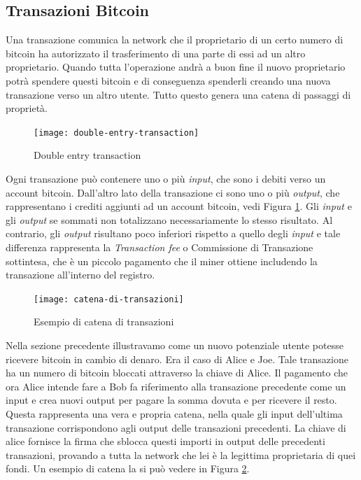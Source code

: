 \subsection{Transazioni Bitcoin}
Una transazione comunica la network che il proprietario di un certo numero di bitcoin ha autorizzato il trasferimento di una parte di essi ad un altro proprietario. Quando tutta l'operazione andrà a buon fine il nuovo proprietario potrà spendere questi bitcoin e di conseguenza spenderli creando una nuova transazione verso un altro utente. Tutto questo genera una catena di passaggi di proprietà.
\begin{figure}
	\centering 
	\texttt{[image: double-entry-transaction]} 
	\caption[Double entry transaction]{Double entry transaction}
	\label{fig:double-entry-transaction} 
\end{figure}
Ogni transazione può contenere uno o più \textit{input}, che sono i debiti verso un account bitcoin. Dall'altro lato della transazione ci sono uno o più \textit{output}, che rappresentano i crediti aggiunti ad un account bitcoin, vedi Figura \ref{fig:double-entry-transaction}. Gli \textit{input} e gli \textit{output} se sommati non totalizzano necessariamente lo stesso risultato. Al contrario, gli \textit{output} risultano poco inferiori rispetto a quello degli \textit{input} e tale differenza rappresenta la \textit{Transaction fee} o Commissione di Transazione sottintesa, che è un piccolo pagamento che il miner ottiene includendo la transazione all'interno del registro. 
\begin{figure}
	\centering 
	\texttt{[image: catena-di-transazioni]} 
	\caption[Esempio di catena di transazioni]{Esempio di catena di transazioni}
	\label{fig:catena-di-transazioni} 
\end{figure}
Nella sezione precedente illustravamo come un nuovo potenziale utente potesse ricevere bitcoin in cambio di denaro. Era il caso di Alice e Joe. Tale transazione ha un numero di bitcoin bloccati attraverso la chiave di Alice. Il pagamento che ora Alice intende fare a Bob fa riferimento alla transazione precedente come un input e crea nuovi output per pagare la somma dovuta e per ricevere il resto. Questa rappresenta una vera e propria catena, nella quale gli input dell'ultima transazione corrispondono agli output delle transazioni precedenti. La chiave di alice fornisce la firma che sblocca questi importi in output delle precedenti transazioni, provando a tutta la network che lei è la legittima proprietaria di quei fondi. Un esempio di catena la si può vedere in Figura \ref{fig:catena-di-transazioni}.

